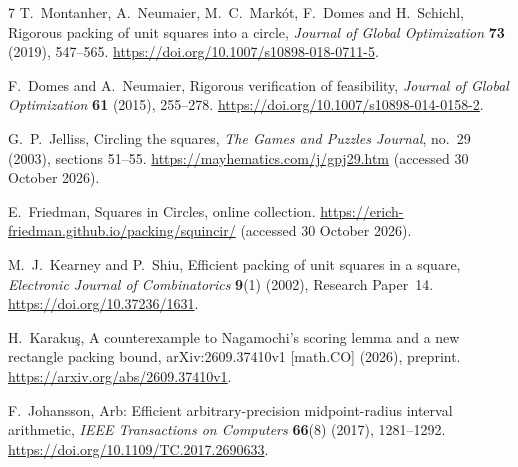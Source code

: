 \begin{thebibliography}{7}
T.~Montanher, A.~Neumaier, M.~C.~Mark\'ot, F.~Domes and H.~Schichl,
Rigorous packing of unit squares into a circle,
\emph{Journal of Global Optimization} \textbf{73} (2019), 547--565.
\url{https://doi.org/10.1007/s10898-018-0711-5}.

F.~Domes and A.~Neumaier,
Rigorous verification of feasibility,
\emph{Journal of Global Optimization} \textbf{61} (2015), 255--278.
\url{https://doi.org/10.1007/s10898-014-0158-2}.

G.~P.~Jelliss,
Circling the squares,
\emph{The Games and Puzzles Journal}, no.~29 (2003), sections 51--55.
\url{https://mayhematics.com/j/gpj29.htm}
(accessed 30 October 2026).

E.~Friedman,
Squares in Circles, online collection.
\url{https://erich-friedman.github.io/packing/squincir/}
(accessed 30 October 2026).

M.~J.~Kearney and P.~Shiu,
Efficient packing of unit squares in a square,
\emph{Electronic Journal of Combinatorics} \textbf{9}(1) (2002), Research Paper~14.
\url{https://doi.org/10.37236/1631}.

H.~Karaku\c{s},
A counterexample to Nagamochi's scoring lemma and a new rectangle packing bound,
arXiv:2609.37410v1 [math.CO] (2026), preprint.
\url{https://arxiv.org/abs/2609.37410v1}.

F.~Johansson,
Arb: Efficient arbitrary-precision midpoint-radius interval arithmetic,
\emph{IEEE Transactions on Computers} \textbf{66}(8) (2017), 1281--1292.
\url{https://doi.org/10.1109/TC.2017.2690633}.
\end{thebibliography}
